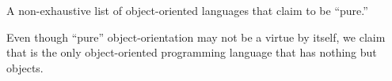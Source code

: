 \begin{table}
\caption{A non-exhaustive list of object-oriented languages that claim to be ``pure.''}
\label{tab:languages}

\end{table}

Even though ``pure'' object-orientation may not be a virtue by itself, we claim that \eolang{} is the only object-oriented programming language that has nothing but objects.
